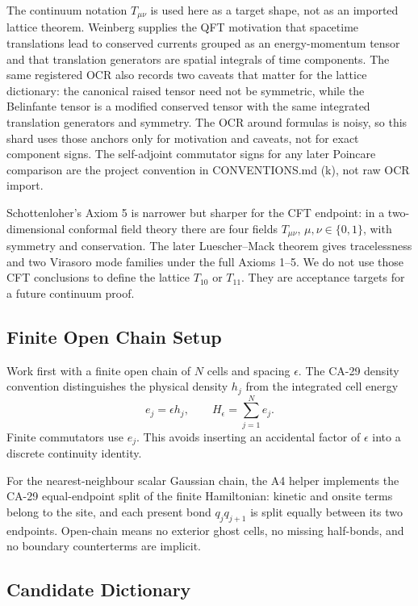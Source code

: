 The continuum notation \(T_{\mu\nu}\) is used here as a target shape, not as an
imported lattice theorem.  Weinberg supplies the QFT motivation that spacetime
translations lead to conserved currents grouped as an energy-momentum tensor and
that translation generators are spatial integrals of time components.  The same
registered OCR also records two caveats that matter for the lattice dictionary:
the canonical raised tensor need not be symmetric, while the Belinfante tensor is
a modified conserved tensor with the same integrated translation generators and
symmetry.  The OCR around formulas is noisy, so this shard uses those anchors
only for motivation and caveats, not for exact component signs.
The self-adjoint commutator signs for any later Poincare comparison are the
project convention in CONVENTIONS.md (k), not raw OCR import.

Schottenloher's Axiom 5 is narrower but sharper for the CFT endpoint: in a
two-dimensional conformal field theory there are four fields \(T_{\mu\nu}\),
\(\mu,\nu\in\{0,1\}\), with symmetry and conservation.  The later
Luescher--Mack theorem gives tracelessness and two Virasoro mode families under
the full Axioms 1--5.  We do not use those CFT conclusions to define the lattice
\(T_{10}\) or \(T_{11}\).  They are acceptance targets for a future continuum
proof.

\subsection{Finite Open Chain Setup}

Work first with a finite open chain of \(N\) cells and spacing \(\epsilon\).  The
CA-29 density convention distinguishes the physical density \(h_j\) from the
integrated cell energy
\[
  e_j=\epsilon h_j,
  \qquad
  H_\epsilon=\sum_{j=1}^N e_j .
\]
Finite commutators use \(e_j\).  This avoids inserting an accidental factor of
\(\epsilon\) into a discrete continuity identity.

For the nearest-neighbour scalar Gaussian chain, the A4 helper implements the
CA-29 equal-endpoint split of the finite Hamiltonian: kinetic and onsite terms
belong to the site, and each present bond \(q_j q_{j+1}\) is split equally
between its two endpoints.  Open-chain means no exterior ghost cells, no missing
half-bonds, and no boundary counterterms are implicit.

\subsection{Candidate Dictionary}

